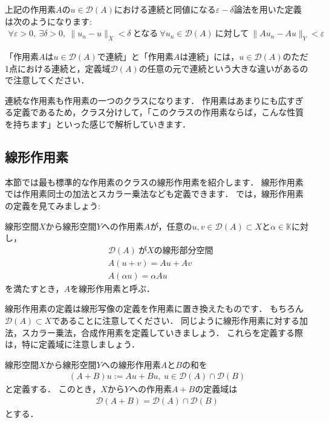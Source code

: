 上記の作用素$A$の$u \in {\mathcal D}(A)$における連続と同値になる$\varepsilon - \delta$論法を用いた定義は次のようになります:
\begin{align*}
\forall \varepsilon > 0, ~ \exists \delta > 0, ~ \| u_n - u \|_{X} < \delta ~ \mbox{となる} ~ \forall u_n \in {\mathcal D}(A) ~ \mbox{に対して} ~ \| A u_n - A u \|_{Y} < \varepsilon
\end{align*}

「作用素$A$は$u \in {\mathcal D}(A)$で連続」と「作用素$A$は連続」には，$u \in {\mathcal D}(A)$のただ1点における連続と，定義域${\mathcal D}(A)$の任意の元で連続という大きな違いがあるので注意してください．

連続な作用素も作用素の一つのクラスになります．
作用素はあまりにも広すぎる定義であるため，クラス分けして，「このクラスの作用素ならば，こんな性質を持ちます」といった感じで解析していきます．


\subsection{線形作用素}
本節では最も標準的な作用素のクラスの線形作用素を紹介します．
線形作用素では作用素同士の加法とスカラー乗法なども定義できます．
では，線形作用素の定義を見てみましょう:

\begin{defi}[線形作用素]\label{def:linearoperator}
線形空間$X$から線形空間$Y$への作用素$A$が，任意の$u, v \in {\mathcal D}(A) \subset X$と$\alpha \in \mathbb{K}$に対し，
\begin{align*}
& {\mathcal D}(A) ~ \mbox{が} X \mbox{の線形部分空間}\\
& A(u + v) = A u + A v \\
& A(\alpha u) = \alpha A u
\end{align*}
を満たすとき，$A$を線形作用素と呼ぶ．
\end{defi}

線形作用素の定義は線形写像の定義を作用素に置き換えたものです．
もちろん${\mathcal D}(A) \subset X$であることに注意してください．
同じように線形作用素に対する加法，スカラー乗法，合成作用素を定義していきましょう．
これらを定義する際は，特に定義域に注意しましょう．

\begin{defi}[線形作用素の加法]\label{def:add_operator}
	線形空間$X$から線形空間$Y$への線形作用素$A$と$B$の和を
	\begin{align*}
	(A + B) u := A u + B u, ~ u \in {\mathcal D}(A) \cap {\mathcal D}(B)
	\end{align*}
	と定義する．
	このとき，$X$から$Y$への作用素$A+B$の定義域は
	\begin{align*}
	{\mathcal D}(A+B) =  {\mathcal D}(A) \cap {\mathcal D}(B)
	\end{align*}
	とする．
\end{defi}


